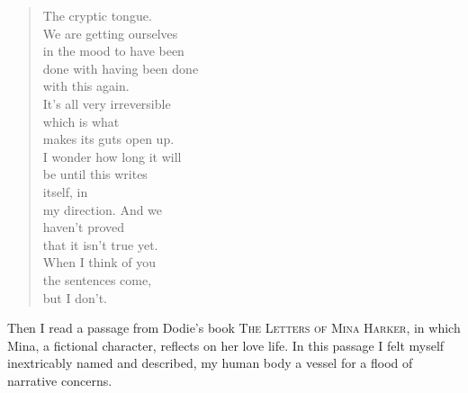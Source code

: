 \documentclass[
]{memoir}
\begin{document}
\begin{verse}
The cryptic tongue.\\
We are getting ourselves\\
in the mood to have been\\
done with having been done\\
with this again.\\
It’s all very irreversible\\
which is what\\
makes its guts open up.\\
I wonder how long it will\\
be until this writes\\
itself, in\\
my direction. And we\\
haven’t proved\\
that it isn’t true yet.\\
When I think of you\\
the sentences come,\\
but I don’t.\\
\end{verse}

Then I read a passage from Dodie's book \textsc{The Letters of Mina
Harker}, in which Mina, a fictional character, reflects on her love
life. In this passage I felt myself inextricably named and described, my
human body a vessel for a flood of narrative concerns.
\end{document}
